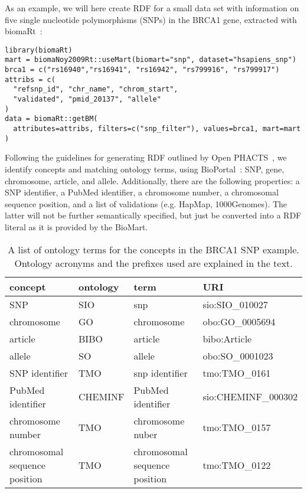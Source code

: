 \documentclass[12pt]{article}
\begin{document}
As an example, we will here create RDF for a small data set with information on five single nucleotide
polymorphisms (SNPs) in the BRCA1 gene, extracted with biomaRt~\cite{Durinck2005}:

\begin{footnotesize}
\begin{verbatim}
library(biomaRt)
mart = biomaNoy2009Rt::useMart(biomart="snp", dataset="hsapiens_snp")
brca1 = c("rs16940","rs16941", "rs16942", "rs799916", "rs799917")
attribs = c(
  "refsnp_id", "chr_name", "chrom_start",
  "validated", "pmid_20137", "allele"
)
data = biomaRt::getBM(
  attributes=attribs, filters=c("snp_filter"), values=brca1, mart=mart
)
\end{verbatim}
\end{footnotesize}

Following the guidelines for generating RDF outlined by Open PHACTS~\cite{Haupt2013,Williams2012}, we identify concepts
and matching ontology terms, using BioPortal~\cite{Noy2009}: SNP, gene, chromosome,
article, and allele. Additionally, there are the following properties: a SNP identifier, a PubMed identifier,
a chromosome number, a chromosomal sequence position, and a list of validations (e.g. HapMap, 1000Genomes).
The latter will not be further semantically specified, but just be converted into a RDF literal as it is
provided by the BioMart.

\begin{table}
\caption{A list of ontology terms for the concepts in the BRCA1 SNP example. Ontology acronyms and the prefixes
used are explained in the text.}
\begin{center}
\begin{footnotesize}
\begin{tabular}{l|l|l|l}
 \textbf{concept} & \textbf{ontology} & \textbf{term} & \textbf{URI} \\
\hline
 SNP & SIO & snp & sio:SIO\_010027 \\
 chromosome & GO & chromosome & obo:GO\_0005694 \\
 article &  BIBO & article & bibo:Article \\
 allele & SO & allele & obo:SO\_0001023 \\
 SNP identifier & TMO & snp identifier & tmo:TMO\_0161 \\
 PubMed identifier & CHEMINF & PubMed identifier & sio:CHEMINF\_000302\\
 chromosome number & TMO & chromosome nuber & tmo:TMO\_0157 \\
 chromosomal sequence position & TMO & chromosomal sequence position & tmo:TMO\_0122 \\
\end{tabular}
\end{footnotesize}
\end{center}
\end{table}
\end{document}
